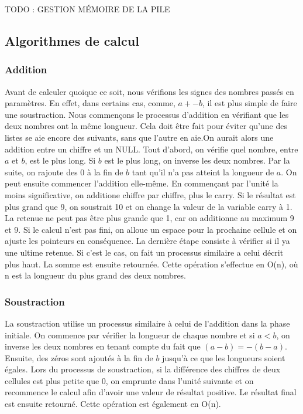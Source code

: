 \documentclass[letterpaper,12pt]{scrartcl}
\begin{document}
         TODO : GESTION MÉMOIRE DE LA PILE
        
        \subsection{Algorithmes de calcul} \label{algos}
            
        
            \subsubsection{Addition}
             Avant de calculer quoique ce soit, nous vérifions les signes des nombres passés en paramètres. En effet, dans certains cas, comme, $a + -b$, il est plus simple de faire une soustraction. Nous commençons le processus d'addition en vérifiant que les deux nombres ont la même longueur. Cela doit être fait pour éviter qu'une des listes se aie encore des suivants, sans que l'autre en aie.On aurait alors une addition entre un chiffre et un NULL. Tout d'abord, on vérifie quel nombre, entre $a$ et $b$, est le plus long. Si $b$ est le plus long, on inverse les deux nombres. Par la suite, on rajoute des 0 à la fin de $b$ tant qu'il n'a pas atteint la longueur de $a$. On peut ensuite commencer l'addition elle-même. En commençant par l'unité la moins significative, on additione chiffre par chiffre, plus le carry. Si le résultat est plus grand que 9, on soustrait 10 et on change la valeur de la variable carry à 1. La retenue ne peut pas être plus grande que 1, car on additionne au maximum 9 et 9. Si le calcul n'est pas fini, on alloue un espace pour la prochaine cellule et on ajuste les pointeurs en conséquence. La dernière étape consiste à vérifier si il ya une ultime retenue. Si c'est le cas, on fait un processus similaire a celui décrit plus haut. La somme est ensuite retournée. Cette opération s'effectue en O(n), où n est la longueur du plus grand des deux nombres.
            
            \subsubsection{Soustraction}
             La soustraction utilise un processus similaire à celui de l'addition dans la phase initiale. On commence par vérifier la longueur de chaque nombre et si $a < b$, on inverse les deux nombres en tenant compte du fait que $(a-b) = -(b-a)$. Ensuite, des zéros sont ajoutés à la fin de $b$ jusqu'à ce que les longueurs soient égales. Lors du processus de soustraction, si la différence des chiffres de deux cellules est plus petite que 0, on emprunte dans l'unité suivante et on recommence le calcul afin d'avoir une valeur de résultat positive. Le résultat final est ensuite retourné. Cette opération est également en O(n).
            
\end{document}

